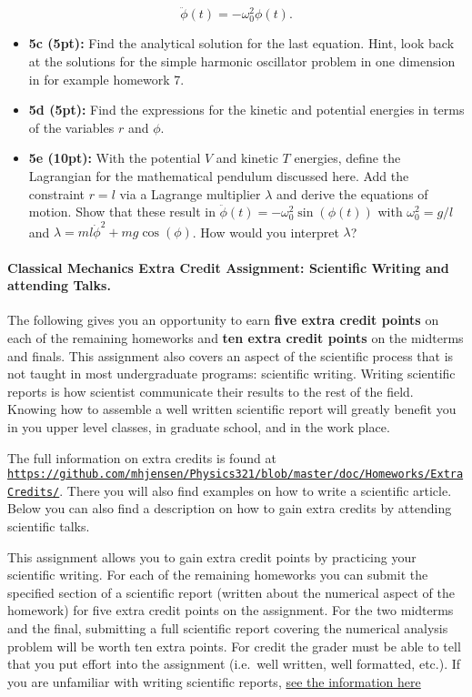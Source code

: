 \documentclass[%
oneside,                 %
final,                   %
10pt]{article}
\begin{document}
\[
\ddot{\phi}(t)=-\omega_0^2\phi(t).
\]

\begin{itemize}
\item \textbf{5c (5pt):} Find the analytical solution for the last equation. Hint, look back at the solutions for the simple harmonic oscillator problem in one dimension in for example homework 7.

\item \textbf{5d (5pt):} Find the expressions for the kinetic and potential energies in terms of the variables $r$ and $\phi$. 

\item \textbf{5e (10pt):} With the potential $V$  and kinetic $T$ energies, define the Lagrangian for the mathematical pendulum discussed here. Add the constraint $r=l$ via a Lagrange multiplier $\lambda$ and derive the equations of motion. Show that these result in  $\ddot{\phi}(t)=-\omega_0^2\sin{(\phi(t))}$ with $\omega_0^2=g/l$ and $\lambda=ml\dot{\phi}^2+mg\cos{(\phi)}$.  How would you interpret $\lambda$? 
\end{itemize}

\noindent
\paragraph{Classical Mechanics Extra Credit Assignment: Scientific Writing and attending Talks.}
The following gives you an opportunity to earn \textbf{five extra credit
points} on each of the remaining homeworks and \textbf{ten extra credit points}
on the midterms and finals.  This assignment also covers an aspect of
the scientific process that is not taught in most undergraduate
programs: scientific writing.  Writing scientific reports is how
scientist communicate their results to the rest of the field.  Knowing
how to assemble a well written scientific report will greatly benefit
you in you upper level classes, in graduate school, and in the work
place.

The full information on extra credits is found at \href{{https://github.com/mhjensen/Physics321/blob/master/doc/Homeworks/ExtraCredits/}}{\nolinkurl{https://github.com/mhjensen/Physics321/blob/master/doc/Homeworks/ExtraCredits/}}. There you will also find examples on how to write a scientific article. 
Below you can also find a description on how to gain extra credits by attending scientific talks.

This assignment allows you to gain extra credit points by practicing
your scientific writing.  For each of the remaining homeworks you can
submit the specified section of a scientific report (written about the
numerical aspect of the homework) for five extra credit points on the
assignment.  For the two midterms and the final, submitting a full
scientific report covering the numerical analysis problem will be
worth ten extra points.  For credit the grader must be able to tell
that you put effort into the assignment (i.e.~well written, well
formatted, etc.).  If you are unfamiliar with writing scientific
reports, \href{{https://github.com/mhjensen/Physics321/blob/master/doc/Homeworks/ExtraCredits/IntroductionScientificWriting.md}}{see the information here}
\end{document}
